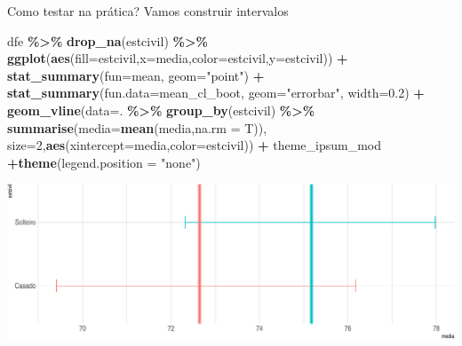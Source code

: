 \documentclass[
  9pt,
  ignorenonframetext,
  aspectratio=169]{beamer}
\newenvironment{Shaded}{\begin{snugshade}}{\end{snugshade}}
\newcommand{\DataTypeTok}[1]{\textcolor[rgb]{0.13,0.29,0.53}{#1}}
\newcommand{\DecValTok}[1]{\textcolor[rgb]{0.00,0.00,0.81}{#1}}
\newcommand{\FloatTok}[1]{\textcolor[rgb]{0.00,0.00,0.81}{#1}}
\newcommand{\KeywordTok}[1]{\textcolor[rgb]{0.13,0.29,0.53}{\textbf{#1}}}
\newcommand{\NormalTok}[1]{#1}
\newcommand{\OperatorTok}[1]{\textcolor[rgb]{0.81,0.36,0.00}{\textbf{#1}}}
\newcommand{\StringTok}[1]{\textcolor[rgb]{0.31,0.60,0.02}{#1}}
\begin{document}
\begin{frame}[fragile]{Como testar na prática? Vamos construir
intervalos}
\protect\hypertarget{como-testar-na-pruxe1tica-vamos-construir-intervalos}{}
\begin{Shaded}
\begin{Highlighting}[]
\NormalTok{dfe }\OperatorTok{\%\textgreater{}\%}\StringTok{ }\KeywordTok{drop\_na}\NormalTok{(estcivil) }\OperatorTok{\%\textgreater{}\%}\StringTok{ }
\StringTok{  }\KeywordTok{ggplot}\NormalTok{(}\KeywordTok{aes}\NormalTok{(}\DataTypeTok{fill=}\NormalTok{estcivil,}\DataTypeTok{x=}\NormalTok{media,}\DataTypeTok{color=}\NormalTok{estcivil,}\DataTypeTok{y=}\NormalTok{estcivil)) }\OperatorTok{+}
\StringTok{  }\KeywordTok{stat\_summary}\NormalTok{(}\DataTypeTok{fun=}\NormalTok{mean, }\DataTypeTok{geom=}\StringTok{"point"}\NormalTok{) }\OperatorTok{+}\StringTok{ }
\StringTok{  }\KeywordTok{stat\_summary}\NormalTok{(}\DataTypeTok{fun.data=}\NormalTok{mean\_cl\_boot, }\DataTypeTok{geom=}\StringTok{"errorbar"}\NormalTok{, }\DataTypeTok{width=}\FloatTok{0.2}\NormalTok{) }\OperatorTok{+}
\StringTok{  }\KeywordTok{geom\_vline}\NormalTok{(}\DataTypeTok{data=}\NormalTok{. }\OperatorTok{\%\textgreater{}\%}\StringTok{ }\KeywordTok{group\_by}\NormalTok{(estcivil) }\OperatorTok{\%\textgreater{}\%}\StringTok{ }\KeywordTok{summarise}\NormalTok{(}\DataTypeTok{media=}\KeywordTok{mean}\NormalTok{(media,}\DataTypeTok{na.rm =}\NormalTok{ T)),}
             \DataTypeTok{size=}\DecValTok{2}\NormalTok{,}\KeywordTok{aes}\NormalTok{(}\DataTypeTok{xintercept=}\NormalTok{media,}\DataTypeTok{color=}\NormalTok{estcivil)) }\OperatorTok{+}\StringTok{ }
\StringTok{  }\NormalTok{theme\_ipsum\_mod }\OperatorTok{+}\KeywordTok{theme}\NormalTok{(}\DataTypeTok{legend.position =} \StringTok{"none"}\NormalTok{)}
\end{Highlighting}
\end{Shaded}

\includegraphics{aula_11_files/figure-beamer/unnamed-chunk-2-1.pdf}
\end{frame}
\end{document}
